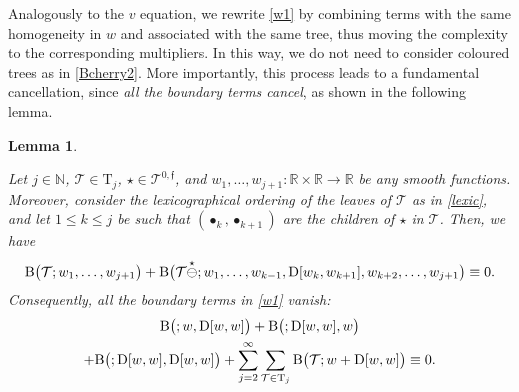 \documentclass[a4paper,
11pt,  reqno]{amsart}
\makeatletter
\newcommand{\5}{\textup{V}}
\newcommand{\noi}{\noindent}
\newtheorem{lemma}[theorem]{Lemma}
\theoremstyle{remark}
\newcommand{\R}{\mathbb{R}}
\newcommand{\bul}{\bullet}
\newcommand{\TT}{\mathcal{T}}
\newcommand{\Tr}{\mathrm{T}}
\newcommand{\ff}{\mathfrak{f}}
\newcommand{\N}{\mathbb{N}}
\def\<#1>{\csname MH@symb@#1\endcsname}
\numberwithin{equation}{section}
\numberwithin{theorem}{section}
\newcommand{\BB}{\mathrm{B}}
\newcommand{\D}{\mathrm{D}}
\makeatother
\begin{document}
\noi Analogously to the $v$ equation, we rewrite \eqref{w1} by combining terms with the same homogeneity in $w$ and associated with the same tree, thus moving the complexity to the corresponding multipliers. In this way, we do not need to consider coloured trees as in \eqref{Bcherry2}. More importantly, this process leads to a fundamental cancellation, since \textit{all the boundary terms cancel}, as shown in the following lemma.





\begin{lemma}
\label{LEM:wbd}




Let $j\in\N$, $\TT\in \Tr_j$, 
$\star \in \TT^{0,\ff}$, and $w_1, \ldots, w_{j+1}: \R\times \R \to \R$ be any smooth functions. Moreover, consider the lexicographical ordering of the leaves of $\TT$ as in \eqref{lexic}, 
and let $1 \le k \le j$ be such that $(\bul_k, \bul_{k+1})$ are the children of $\star$ in $\TT$. 
Then, we have 
\begin{align}
\label{wbd0}
\BB\big(\TT ; w_1, \ldots, w_{j+1} \big) 
+ \BB\big(\TT\overset{\star}{\ominus} \<1>; w_1,  \ldots, w_{k-1} , \D[w_k,w_{k+1}] , w_{k+2}, \ldots,  w_{j+1} \big) 
\equiv 0.
\end{align}
Consequently, all the boundary terms in \eqref{w1} vanish:
\begin{multline}
\label{wbd1}
  \BB \big(\<1>; w, \D[w, w] \big) 
+ \BB\big(\<1>; \D[w, w],w\big) 
\\
+
\BB\big(\<1>;\D[w, w], \D[w, w]\big)
+ \sum_{j=2}^\infty \sum_{\TT\in \Tr_j}  \BB\big(\TT; w + \D[w, w]\big)  \equiv 0  .
\end{multline}


\end{lemma}
\end{document}
